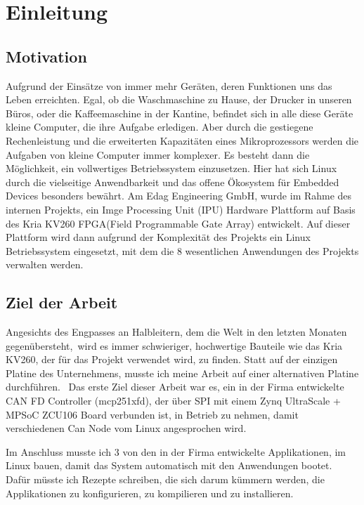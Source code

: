 \chapter{Einleitung}
\label{cha:Einleitung}

\section{Motivation}
\label{sec:Einl:Motivation}

Aufgrund der Einsätze von immer mehr Geräten, deren Funktionen uns das Leben erreichten. Egal, ob die Waschmaschine zu Hause, der Drucker in unseren Büros, oder die Kaffeemaschine in der Kantine, befindet sich in alle diese Geräte kleine Computer, die ihre Aufgabe erledigen. Aber durch die gestiegene Rechenleistung und die erweiterten Kapazitäten eines Mikroprozessors werden die Aufgaben von kleine Computer immer komplexer.  Es besteht dann die Möglichkeit, ein vollwertiges Betriebssystem einzusetzen. Hier hat sich Linux durch die vielseitige Anwendbarkeit und das offene Ökosystem für Embedded Devices besonders bewährt. 
Am Edag Engineering GmbH, wurde im Rahme des internen Projekts, ein Imge Processing Unit (IPU) Hardware Plattform auf Basis des Kria KV260 FPGA(Field Programmable Gate Array) entwickelt.  Auf dieser Plattform wird dann aufgrund der Komplexität des Projekts ein Linux Betriebssystem eingesetzt, mit dem die 8 wesentlichen Anwendungen des Projekts verwalten werden. 

\section{Ziel der Arbeit}
\label{sec:Einl:Ziel_der_Arbeit}

Angesichts des Engpasses an Halbleitern, dem die Welt in den letzten Monaten gegenübersteht, wird es immer schwieriger, hochwertige Bauteile wie das Kria KV260, der für das Projekt verwendet wird, zu finden. Statt auf der einzigen Platine des Unternehmens, musste ich meine Arbeit auf einer alternativen Platine durchführen. 
Das erste Ziel dieser Arbeit war es, ein in der Firma entwickelte CAN FD Controller (mcp251xfd), der über SPI mit einem Zynq UltraScale + MPSoC ZCU106 Board verbunden ist, in Betrieb zu nehmen, damit verschiedenen Can Node vom Linux angesprochen wird. 

Im Anschluss musste ich 3 von den in der Firma entwickelte Applikationen, im Linux bauen, damit das System automatisch mit den Anwendungen bootet. Dafür müsste ich Rezepte schreiben, die sich darum kümmern werden, die Applikationen zu konfigurieren, zu kompilieren und zu installieren. 

